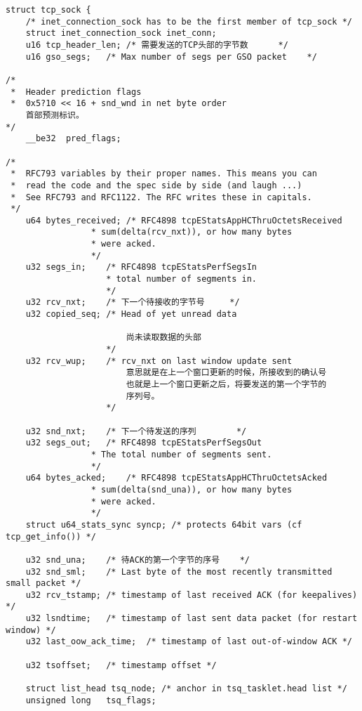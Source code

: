 \begin{verbatim}
struct tcp_sock {
    /* inet_connection_sock has to be the first member of tcp_sock */
    struct inet_connection_sock inet_conn;
    u16 tcp_header_len; /* 需要发送的TCP头部的字节数      */
    u16 gso_segs;   /* Max number of segs per GSO packet    */

/*
 *  Header prediction flags
 *  0x5?10 << 16 + snd_wnd in net byte order
    首部预测标识。
*/
    __be32  pred_flags; 

/*
 *  RFC793 variables by their proper names. This means you can
 *  read the code and the spec side by side (and laugh ...)
 *  See RFC793 and RFC1122. The RFC writes these in capitals.
 */
    u64 bytes_received; /* RFC4898 tcpEStatsAppHCThruOctetsReceived
                 * sum(delta(rcv_nxt)), or how many bytes
                 * were acked.
                 */
    u32 segs_in;    /* RFC4898 tcpEStatsPerfSegsIn
                    * total number of segments in.
                    */
    u32 rcv_nxt;    /* 下一个待接收的字节号     */
    u32 copied_seq; /* Head of yet unread data      

                        尚未读取数据的头部                  
                    */
    u32 rcv_wup;    /* rcv_nxt on last window update sent   
                        意思就是在上一个窗口更新的时候，所接收到的确认号
                        也就是上一个窗口更新之后，将要发送的第一个字节的
                        序列号。
                    */

    u32 snd_nxt;    /* 下一个待发送的序列        */
    u32 segs_out;   /* RFC4898 tcpEStatsPerfSegsOut
                 * The total number of segments sent.
                 */
    u64 bytes_acked;    /* RFC4898 tcpEStatsAppHCThruOctetsAcked
                 * sum(delta(snd_una)), or how many bytes
                 * were acked.
                 */
    struct u64_stats_sync syncp; /* protects 64bit vars (cf tcp_get_info()) */

    u32 snd_una;    /* 待ACK的第一个字节的序号    */
    u32 snd_sml;    /* Last byte of the most recently transmitted small packet */
    u32 rcv_tstamp; /* timestamp of last received ACK (for keepalives) */
    u32 lsndtime;   /* timestamp of last sent data packet (for restart window) */
    u32 last_oow_ack_time;  /* timestamp of last out-of-window ACK */

    u32 tsoffset;   /* timestamp offset */

    struct list_head tsq_node; /* anchor in tsq_tasklet.head list */
    unsigned long   tsq_flags;


\end{verbatim}

